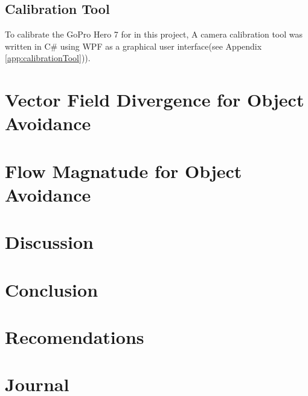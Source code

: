 \documentclass{UoNMCHA}
\numberwithin{equation}{section}
\begin{document}
\subsection{Calibration Tool}
To calibrate the GoPro Hero 7 for in this project, A camera calibration tool was written in C\# using WPF as a graphical user interface(see Appendix \ref{app:calibrationTool})). 

\newpage
\section{Vector Field Divergence for Object Avoidance}

\newpage
\section{Flow Magnatude for Object Avoidance}

\newpage
\section{Discussion}

\newpage
\section{Conclusion}\label{sec:Conclusion}

\newpage
\section{Recomendations}

\newpage


\appendix
\newpage
\section{Journal}\label{app:Journal}
\newpage
\end{document}

